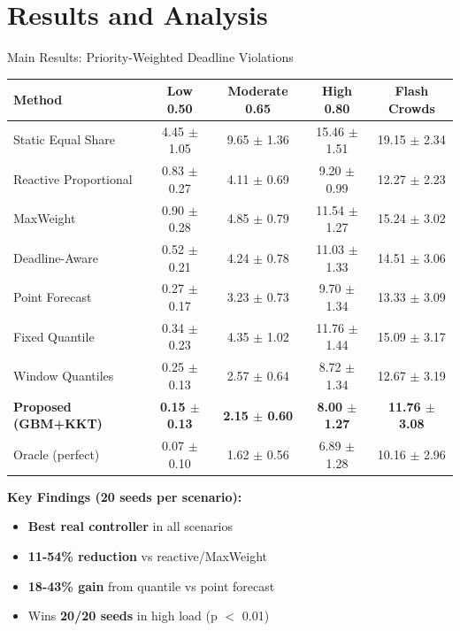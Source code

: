 \documentclass[aspectratio=169]{beamer}
\begin{document}
\section{Results and Analysis}

\begin{frame}{Main Results: Priority-Weighted Deadline Violations}
\begin{table}
\tiny
\begin{tabular}{lcccc}
\toprule
\textbf{Method} & \textbf{Low 0.50} & \textbf{Moderate 0.65} & \textbf{High 0.80} & \textbf{Flash Crowds} \\
\midrule
Static Equal Share & 4.45 $\pm$ 1.05 & 9.65 $\pm$ 1.36 & 15.46 $\pm$ 1.51 & 19.15 $\pm$ 2.34 \\
Reactive Proportional & 0.83 $\pm$ 0.27 & 4.11 $\pm$ 0.69 & 9.20 $\pm$ 0.99 & 12.27 $\pm$ 2.23 \\
MaxWeight & 0.90 $\pm$ 0.28 & 4.85 $\pm$ 0.79 & 11.54 $\pm$ 1.27 & 15.24 $\pm$ 3.02 \\
Deadline-Aware & 0.52 $\pm$ 0.21 & 4.24 $\pm$ 0.78 & 11.03 $\pm$ 1.33 & 14.51 $\pm$ 3.06 \\
Point Forecast & 0.27 $\pm$ 0.17 & 3.23 $\pm$ 0.73 & 9.70 $\pm$ 1.34 & 13.33 $\pm$ 3.09 \\
Fixed Quantile & 0.34 $\pm$ 0.23 & 4.35 $\pm$ 1.02 & 11.76 $\pm$ 1.44 & 15.09 $\pm$ 3.17 \\
Window Quantiles & 0.25 $\pm$ 0.13 & 2.57 $\pm$ 0.64 & 8.72 $\pm$ 1.34 & 12.67 $\pm$ 3.19 \\
\rowcolor{green!20}
\textbf{Proposed (GBM+KKT)} & \textbf{0.15 $\pm$ 0.13} & \textbf{2.15 $\pm$ 0.60} & \textbf{8.00 $\pm$ 1.27} & \textbf{11.76 $\pm$ 3.08} \\
Oracle (perfect) & 0.07 $\pm$ 0.10 & 1.62 $\pm$ 0.56 & 6.89 $\pm$ 1.28 & 10.16 $\pm$ 2.96 \\
\bottomrule
\end{tabular}
\end{table}

\vspace{0.3cm}
\textbf{Key Findings (20 seeds per scenario):}
\begin{itemize}
    \item \textbf{Best real controller} in all scenarios
    \item \textbf{11-54\% reduction} vs reactive/MaxWeight
    \item \textbf{18-43\% gain} from quantile vs point forecast
    \item Wins \textbf{20/20 seeds} in high load (p $<$ 0.01)
\end{itemize}
\end{frame}
\end{document}
